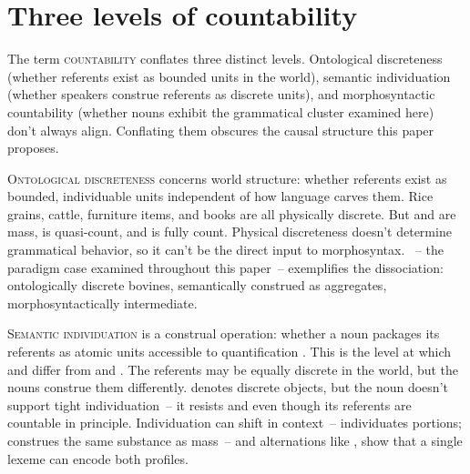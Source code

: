 \documentclass[12pt,a4paper]{article}
\begin{document}
\section{Three levels of countability}\label{sec:levels}

The term \textsc{countability} conflates three distinct levels. Ontological discreteness (whether referents exist as bounded units in the world), semantic individuation (whether speakers construe referents as discrete units), and morphosyntactic countability (whether nouns exhibit the grammatical cluster examined here) don't always align. Conflating them obscures the causal structure this paper proposes.

\textsc{Ontological discreteness} concerns world structure: whether referents exist as bounded, individuable units independent of how language carves them. Rice grains, cattle, furniture items, and books are all physically discrete. But  and  are mass,  is quasi-count, and  is fully count. Physical discreteness doesn't determine grammatical behavior, so it can't be the direct input to morphosyntax. ~-- the paradigm case examined throughout this paper~-- exemplifies the dissociation: ontologically discrete bovines, semantically construed as aggregates, morphosyntactically intermediate.

\textsc{Semantic individuation} is a construal operation: whether a noun packages its referents as atomic units accessible to quantification \citep{chierchia1998,rothstein2010,grimm2018}. This is the level at which  and  differ from  and . The referents may be equally discrete in the world, but the nouns construe them differently.  denotes discrete objects, but the noun doesn't support tight individuation~-- it resists  and  even though its referents are countable in principle. Individuation can shift in context~--  individuates portions;  construes the same substance as mass~-- and alternations like ,  show that a single lexeme can encode both profiles.
\end{document}
